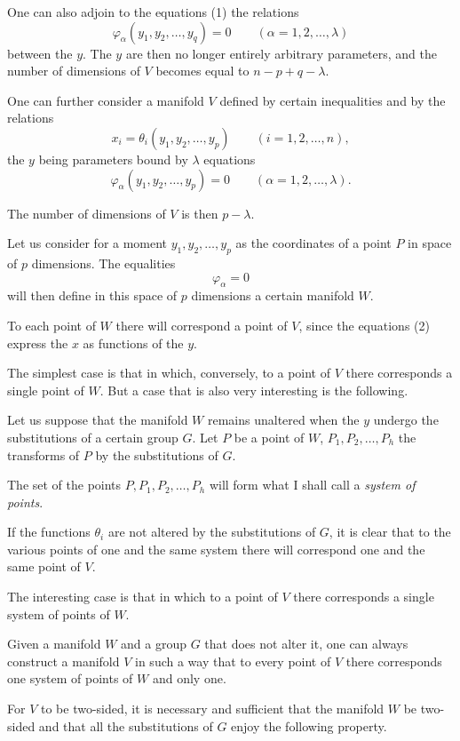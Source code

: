 \documentclass{article}
\begin{document}
One can also adjoin to the equations (1) the relations
\[ \varphi_{\alpha}(y_{1}, y_{2}, \ldots, y_{q}) = 0 \qquad (\alpha = 1, 2, \ldots, \lambda) \]
between the $y$. The $y$ are then no longer entirely arbitrary parameters, and the number of dimensions of $V$ becomes equal to $n - p + q - \lambda$.

One can further consider a manifold $V$ defined by certain inequalities and by the relations
\[ x_{i} = \theta_{i}(y_{1}, y_{2}, \ldots, y_{p}) \qquad (i = 1, 2, \ldots, n), \tag{2} \]
the $y$ being parameters bound by $\lambda$ equations
\[ \varphi_{\alpha}(y_{1}, y_{2}, \ldots, y_{p}) = 0 \qquad (\alpha = 1, 2, \ldots, \lambda). \]

The number of dimensions of $V$ is then $p - \lambda$.

Let us consider for a moment $y_{1}, y_{2}, \ldots, y_{p}$ as the coordinates of a point $P$ in space of $p$ dimensions. The equalities
\[ \varphi_{\alpha} = 0 \]
will then define in this space of $p$ dimensions a certain manifold $W$.

To each point of $W$ there will correspond a point of $V$, since the equations (2) express the $x$ as functions of the $y$.

The simplest case is that in which, conversely, to a point of $V$ there corresponds a single point of $W$. But a case that is also very interesting is the following.

Let us suppose that the manifold $W$ remains unaltered when the $y$ undergo the substitutions of a certain group $G$. Let $P$ be a point of $W$, $P_{1}, P_{2}, \ldots, P_{h}$ the transforms of $P$ by the substitutions of $G$.

The set of the points $P, P_{1}, P_{2}, \ldots, P_{h}$ will form what I shall call a \emph{system of points}.

If the functions $\theta_{i}$ are not altered by the substitutions of $G$, it is clear that to the various points of one and the same system there will correspond one and the same point of $V$.

The interesting case is that in which to a point of $V$ there corresponds a single system of points of $W$.

Given a manifold $W$ and a group $G$ that does not alter it, one can always construct a manifold $V$ in such a way that to every point of $V$ there corresponds one system of points of $W$ and only one.

For $V$ to be two-sided, it is necessary and sufficient that the manifold $W$ be two-sided and that all the substitutions of $G$ enjoy the following property.
\end{document}
